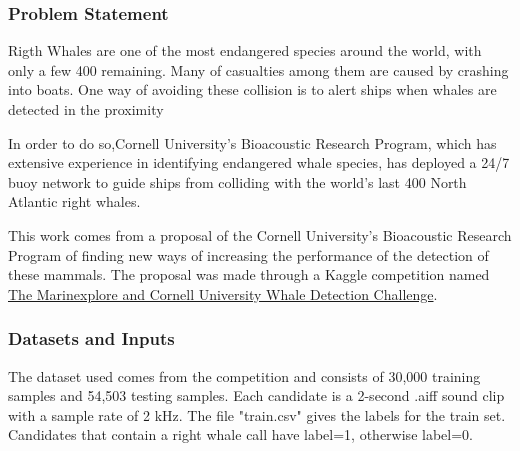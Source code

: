 \documentclass[]{article}
\newcommand{\competition}{The Marinexplore and Cornell University Whale Detection Challenge}
\begin{document}
\subsubsection{Problem Statement}\label{problem-statement}

Rigth Whales are one of the most endangered species around the world, with only a few 400 remaining. Many of casualties among them are caused by crashing into boats. One way of avoiding these collision is to alert ships when whales are detected in the proximity

In order to do so,Cornell University's Bioacoustic Research Program, which has extensive experience in identifying endangered whale species, has deployed a 24/7 buoy network to guide ships from colliding with the world's last 400 North Atlantic right whales.

This work comes from a proposal of the Cornell University's Bioacoustic Research Program of finding new ways of increasing the performance of the detection of these mammals. The proposal was made through a Kaggle competition named \href{https://www.kaggle.com/c/whale-detection-challenge}{\competition}.

\subsubsection{Datasets and Inputs}\label{datasets-and-inputs}

The dataset used comes from the competition and consists of 30,000 training samples and 54,503 testing samples. Each candidate is a 2-second .aiff sound clip with a sample rate of 2 kHz. The file "train.csv" gives the labels for the train set. Candidates that contain a right whale call have label=1, otherwise label=0.
\end{document}
